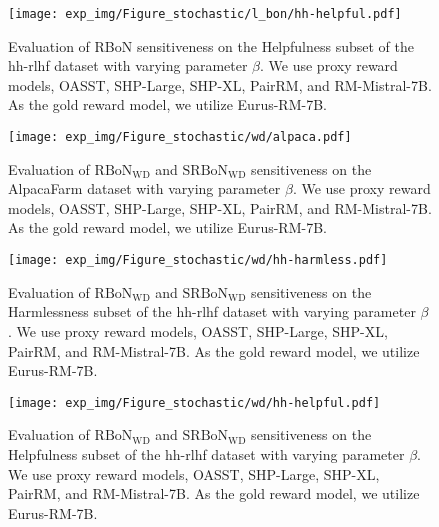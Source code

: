 \begin{figure}[htbp]
    \centering
    \texttt{[image: exp\_img/Figure\_stochastic/l\_bon/hh-helpful.pdf]}
    \caption{
    Evaluation of RBoN sensitiveness on the Helpfulness subset of the hh-rlhf dataset with varying parameter $\beta$. We use proxy reward models, OASST, SHP-Large, SHP-XL, PairRM, and RM-Mistral-7B. As the gold reward model, we utilize Eurus-RM-7B.
    }
    \label{fig:helpful-l}
\end{figure} 
\begin{figure}[htbp]
    \centering
    \texttt{[image: exp\_img/Figure\_stochastic/wd/alpaca.pdf]}
    \caption{
   Evaluation of $\mathrm{RBoN}_{\mathrm{WD}}$ and $\mathrm{SRBoN}_{\mathrm{WD}}$ sensitiveness on the AlpacaFarm dataset with varying parameter $\beta$. We use proxy reward models, OASST, SHP-Large, SHP-XL,  PairRM, and RM-Mistral-7B. As the gold reward model, we utilize Eurus-RM-7B.
    }
    \label{fig:alpaca-wd}
\end{figure}
\begin{figure}[htbp]
    \centering
    \texttt{[image: exp\_img/Figure\_stochastic/wd/hh-harmless.pdf]}
    \caption{
    Evaluation of $\mathrm{RBoN}_{\mathrm{WD}}$ and $\mathrm{SRBoN}_{\mathrm{WD}}$ sensitiveness on the Harmlessness subset of the hh-rlhf dataset with varying parameter $\beta$. We use proxy reward models, OASST, SHP-Large, SHP-XL,  PairRM, and RM-Mistral-7B. As the gold reward model, we utilize Eurus-RM-7B.
    }
    \label{fig:harmless-wd}
\end{figure}

\begin{figure}[htbp]
    \centering
    \texttt{[image: exp\_img/Figure\_stochastic/wd/hh-helpful.pdf]}
    \caption{
    Evaluation of $\mathrm{RBoN}_{\mathrm{WD}}$ and $\mathrm{SRBoN}_{\mathrm{WD}}$ sensitiveness on the Helpfulness subset of the hh-rlhf dataset with varying parameter $\beta$. We use proxy reward models, OASST, SHP-Large, SHP-XL,  PairRM, and RM-Mistral-7B. As the gold reward model, we utilize Eurus-RM-7B.
    }
    \label{fig:helpful-wd}
\end{figure}

